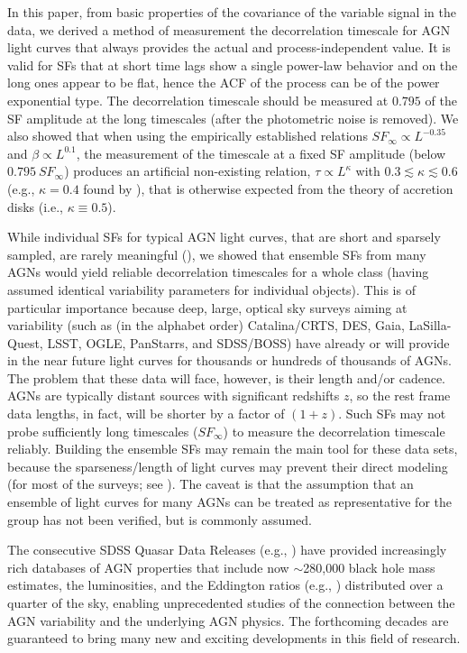 \documentclass[twocolumn]{aastex6}
\begin{document}
In this paper, from basic properties of the covariance of the variable signal in the data, we derived a method of measurement the decorrelation timescale for AGN light curves
that always provides the actual and process-independent value. It is valid for SFs that at short time lags show a single power-law behavior 
and on the long ones appear to be flat, hence the ACF of the process can be of the power exponential type. The decorrelation timescale 
should be measured at $0.795$ of the SF amplitude at the long timescales (after the photometric noise is removed). We also showed that 
when using the empirically established relations $SF_\infty \propto L^{-0.35}$ and $\beta\propto L^{0.1}$, the measurement of the 
timescale at a fixed SF amplitude (below $0.795~SF_\infty$) produces an artificial non-existing relation, 
$\tau \propto L^\kappa$ with $0.3\lesssim \kappa \lesssim 0.6$ (e.g., $\kappa=0.4$ found by \citealt{2016arXiv161103082C}), 
that is otherwise expected from the theory of accretion disks (i.e., $\kappa \equiv 0.5$).

While individual SFs for typical AGN light curves, that are short and sparsely sampled, are rarely meaningful (\citealt{2010MNRAS.404..931E}),
we showed that ensemble SFs from many AGNs would yield reliable decorrelation timescales for a whole class (having assumed identical
variability parameters for individual objects). This is of particular importance
because deep, large, optical sky surveys aiming at variability (such as (in the alphabet order) Catalina/CRTS, DES, Gaia, LaSilla-Quest, LSST, OGLE, PanStarrs, and SDSS/BOSS) 
have already or will provide in the near future light curves for thousands or hundreds of thousands of AGNs. The problem that these data will face, 
however, is their length and/or cadence. AGNs are typically distant sources with
significant redshifts $z$, so the rest frame data lengths, in fact, will be shorter by a factor of $(1+z)$. Such SFs may not probe sufficiently long timescales ($SF_\infty$)
to measure the decorrelation timescale reliably. Building the ensemble SFs may remain the main tool for these data sets, because the sparseness/length of light curves 
may prevent their direct modeling (for most of the surveys; see \citealt{2016arXiv161108248K}). The caveat is that the assumption that an ensemble of light curves for many AGNs can be treated 
as representative for the group has not been verified, but is commonly assumed.

The consecutive SDSS Quasar Data Releases (e.g., \citealt{2010AJ....139.2360S,2016arXiv160806483P}) have provided increasingly rich databases of 
AGN properties that include now $\sim$280,000 black hole mass estimates, 
the luminosities, and the Eddington ratios (e.g., \citealt{2011ApJS..194...45S,2016arXiv160909489K}) distributed over a quarter of the sky, 
enabling unprecedented studies of the connection between the AGN variability and the underlying AGN physics. The forthcoming decades 
are guaranteed to bring many new and exciting developments in this field of research.
\end{document}

